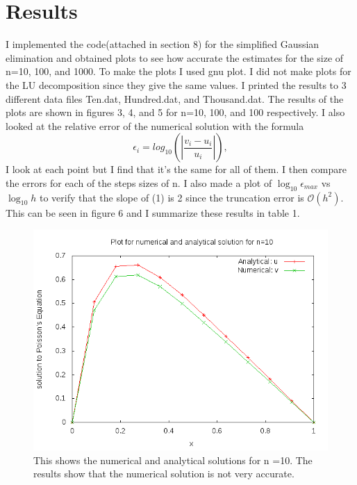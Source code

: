 \documentclass[11pt,a4wide]{article}
\begin{document}
\section{Results}
 I implemented the code(attached in section 8) for the simplified Gaussian elimination and obtained plots to see how accurate the estimates for the size of n=10, 100, and 1000.  To make the plots I used gnu plot. I did not make plots for the LU decomposition since they give the same values. I printed the results to 3 different data files Ten.dat, Hundred.dat, and Thousand.dat. The results of the plots are shown in figures 3, 4, and 5 for n=10, 100, and 100 respectively. I also looked at the relative error of the numerical solution with the formula 
\[
   \epsilon_i=log_{10}\left(\left|\frac{v_i-u_i}
                 {u_i}\right|\right),
\]
I look at each point but I find that it's the same for all of them. I then compare the errors for each of the steps sizes of n. I also made a plot of $\log_{10}{\epsilon_{max}}$ vs $\log_{10}{h}$ to verify that the slope of (1) is 2 since the truncation error is $\mathcal{O}(h^2)$. This can be seen in figure 6 and I summarize these results in table 1. 
\begin{figure}[H]
\centering
\includegraphics[width=120mm]{Ten.png}
\caption{This shows the numerical and analytical solutions for n =10. The results show that the numerical solution is not very accurate. \label{overflow}}
\end{figure}
\end{document}
